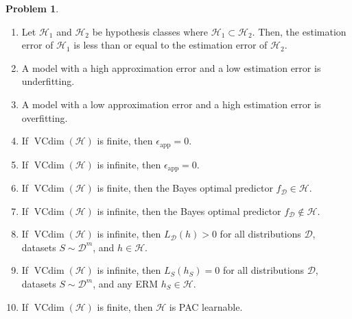 \documentclass[10pt]{article}
\theoremstyle{definition}
\newtheorem{problem}{Problem}
\DeclareMathOperator{\vcdim}{VCdim}
\newcommand{\epsapp}{\epsilon_{\text{app}}}
\begin{document}
\begin{problem}
\begin{enumerate}
        \item
            Let $\mathcal H_1$ and $\mathcal H_2$ be hypothesis classes where $\mathcal H_1 \subset \mathcal H_2$.
            Then, the estimation error of $\mathcal H_1$ is less than or equal to the estimation error of $\mathcal H_2$.
            \vspace{2.75in}

        \item
            A model with a high approximation error and a low estimation error is underfitting.
            \vspace{2.75in}

        \item
            A model with a low approximation error and a high estimation error is overfitting.
            \vspace{2.75in}

        \item 
            If $\vcdim(\mathcal H)$ is finite,
            then $\epsapp=0$.
            \vspace{2.75in}
        \item 
            If $\vcdim(\mathcal H)$ is infinite,
            then $\epsapp=0$.
            \vspace{2.75in}
        \item
            If $\vcdim(\mathcal H)$ is finite,
            then the Bayes optimal predictor $f_\mathcal D \in \mathcal H$.
            \vspace{2.75in}

        \item
            If $\vcdim(\mathcal H)$ is infinite,
            then the Bayes optimal predictor $f_\mathcal D \not \in \mathcal H$.
            \vspace{2.75in}

        \item
            If $\vcdim(\mathcal H)$ is infinite,
            then $L_\mathcal D(h) > 0$ for all distributions $\mathcal D$, datasets $S\sim\mathcal D^m$, and $h\in\mathcal H$.
            \vspace{2.75in}

        \item
            If $\vcdim(\mathcal H)$ is infinite,
            then $L_S(h_S) = 0$ for all distributions $\mathcal D$, datasets $S\sim\mathcal D^m$, and any ERM $h_S\in\mathcal H$.
            \vspace{2.75in}

        \item
            If $\vcdim(\mathcal H)$ is finite,
            then $\mathcal H$ is PAC learnable.
            \vspace{2.75in}


\end{enumerate}
\end{problem}
\end{document}
